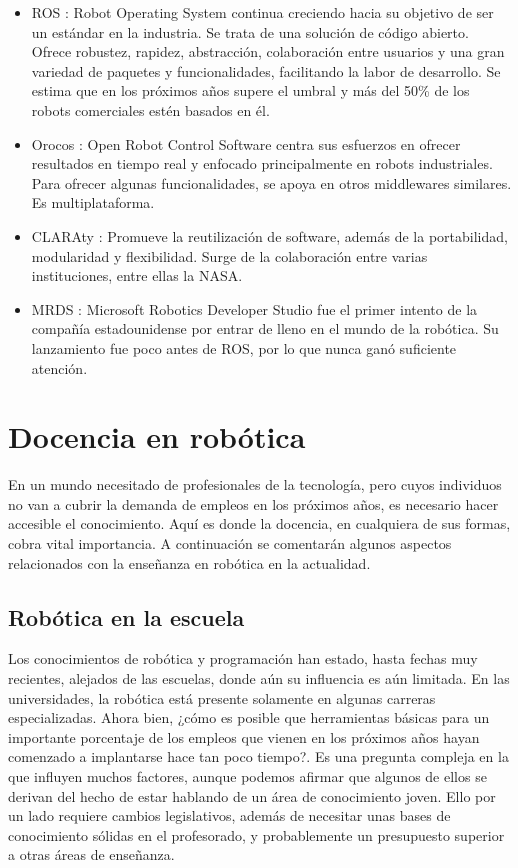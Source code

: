 \documentclass[12pt,spanish,chapterprefix, numbers=noenddot]{book}
\numberwithin{equation}{section}
\numberwithin{figure}{section}
\begin{document}
\begin{itemize}
\item ROS \cite{ros}: Robot Operating System continua creciendo hacia su objetivo de ser un estándar en la industria. Se trata de una solución de código abierto. Ofrece robustez, rapidez, abstracción, colaboración entre usuarios y una gran variedad de paquetes y funcionalidades, facilitando la labor de desarrollo. Se estima que en los próximos años supere el umbral y más del 50\% de los robots comerciales estén basados en él. 
\item Orocos \cite{orocos}: Open Robot Control Software centra sus esfuerzos en ofrecer resultados en tiempo real y enfocado principalmente en robots industriales. Para ofrecer algunas funcionalidades, se apoya en otros middlewares similares. Es multiplataforma.  
\item CLARAty \cite{claraty}: Promueve la reutilización de software, además de la portabilidad, modularidad y flexibilidad. Surge de la colaboración entre varias instituciones, entre ellas la NASA.
\item MRDS \cite{mrds}: Microsoft Robotics Developer Studio fue el primer intento de la compañía estadounidense por entrar de lleno en el mundo de la robótica. Su lanzamiento fue poco antes de ROS, por lo que nunca ganó suficiente atención. 
\end{itemize}

\section{Docencia en robótica}
En un mundo necesitado de profesionales de la tecnología, pero cuyos individuos no van a cubrir la demanda de empleos en los próximos años, es necesario hacer accesible el conocimiento. Aquí es donde la docencia, en cualquiera de sus formas, cobra vital importancia. A continuación se comentarán algunos aspectos relacionados con la enseñanza en robótica en la actualidad. 
\subsection{Robótica en la escuela}
Los conocimientos de robótica y programación han estado, hasta fechas muy recientes, alejados de las escuelas, donde aún su influencia es aún limitada. En las universidades,  la robótica está presente solamente en algunas carreras especializadas. Ahora bien, ¿cómo es posible que herramientas básicas para un importante porcentaje de los empleos que vienen en los próximos años hayan comenzado a implantarse hace tan poco tiempo?. Es una pregunta compleja en la que influyen muchos factores, aunque podemos afirmar que algunos de ellos se derivan del hecho de estar hablando de un área de conocimiento joven. Ello por un lado requiere cambios legislativos, además de necesitar unas bases de conocimiento sólidas en el profesorado, y probablemente un presupuesto superior a otras áreas de enseñanza. 
\end{document}
